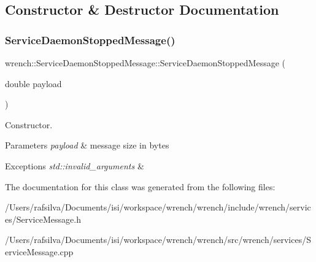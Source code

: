 \subsection{Constructor \& Destructor Documentation}
\mbox{\label{classwrench_1_1_service_daemon_stopped_message_a253785d9c7d9599c22ae6370ca234435}} 
\subsubsection{\texorpdfstring{Service\+Daemon\+Stopped\+Message()}{ServiceDaemonStoppedMessage()}}
{\footnotesize\ttfamily wrench\+::\+Service\+Daemon\+Stopped\+Message\+::\+Service\+Daemon\+Stopped\+Message (\begin{DoxyParamCaption}\item[{double}]{payload }\end{DoxyParamCaption})}



Constructor. 


\begin{DoxyParams}{Parameters}
{\em payload} & message size in bytes\\
\hline
\end{DoxyParams}

\begin{DoxyExceptions}{Exceptions}
{\em std\+::invalid\+\_\+arguments} & \\
\hline
\end{DoxyExceptions}


The documentation for this class was generated from the following files\+:\begin{DoxyCompactItemize}
\item 
/\+Users/rafsilva/\+Documents/isi/workspace/wrench/wrench/include/wrench/services/Service\+Message.\+h\item 
/\+Users/rafsilva/\+Documents/isi/workspace/wrench/wrench/src/wrench/services/Service\+Message.\+cpp\end{DoxyCompactItemize}
